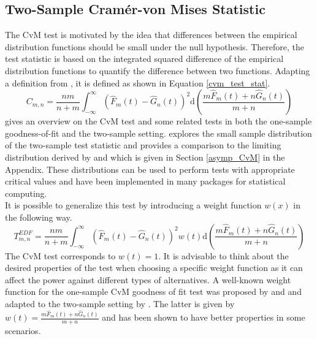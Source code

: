 \documentclass[12pt, a4paper]{article}
\theoremstyle{MAstyle} \newtheorem{assumption}{Assumption}[section]
\theoremstyle{MAstyle} \newtheorem{definition}{Definition}[section]
\theoremstyle{MAstyle} \newtheorem{theorem}{Theorem}[section]
\begin{document}
		\subsection{Two-Sample Cram\'{e}r-von Mises Statistic}\label{Two_sample_CvM}
			The CvM test is motivated by the idea that differences between the empirical distribution functions should be small under the null hypothesis. Therefore, the test statistic is based on the integrated squared difference of the empirical distribution functions to quantify the difference between two functions.
			Adapting a definition from \cite{buning_nichtparametrische_2013}, it is defined as shown in Equation \ref{cvm_test_stat}.
			\begin{equation}\label{cvm_test_stat}
				C_{m,n} = \frac{nm}{n+m} \int_{-\infty}^{\infty}\left(\hat{F}_{m}(t) - \hat{G}_{n}(t)\right)^{2} \mathrm{d} \left(\frac{m \hat{F}_{m}(t) + n \hat{G}_{n}(t)}{m+n}\right)
			\end{equation}
			\cite{darling_kolmogorov-smirnov_1957} gives an overview on the CvM test and some related tests in both the one-sample goodness-of-fit and the two-sample setting. \cite{anderson_distribution_1962} explores the small sample distribution of the two-sample test statistic and provides a comparison to the limiting distribution derived by \cite{rosenblatt_limit_1952} and \cite{fisz_result_1960} which is given in Section \ref{asymp_CvM} in the Appendix. These distributions can be used to perform tests with appropriate critical values and have been implemented in many packages for statistical computing.\\
			
			It is possible to generalize this test by introducing a weight function $w(x)$ in the following way. 
			\begin{equation}
				T^{\textit{EDF}}_{m,n} = \frac{nm}{n+m} \int_{-\infty}^{\infty}\left(\hat{F}_{m}(t) - \hat{G}_{n}(t)\right)^{2} w(t) \mathrm{d} \left(\frac{m \hat{F}_{m}(t) + n \hat{G}_{n}(t)}{m+n}\right)
			\end{equation}
			The CvM test corresponds to $w(t) = 1$. It is advisable to think about the desired properties of the test when choosing a specific weight function as it can affect the power against different types of alternatives. A well-known weight function for the one-sample CvM goodness of fit test was proposed by \cite{anderson_asymptotic_1952} and \cite{anderson_test_1954} and adapted to the two-sample setting by \cite{pettitt_two-sample_1976}. The latter is given by $w(t) = \frac{m \hat{F}_m(t) + n \hat{G}_n(t)}{m+n}$ and has been shown to have better properties in some scenarios.					
			
\end{document}
